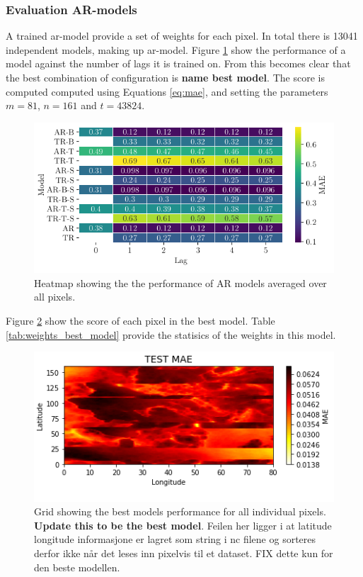 \subsubsection{Evaluation AR-models}
A trained \acrshort{ar}-model provide a set of weights for each pixel. In total there is 13041 independent models, making up \acrshort{ar}-model. Figure \ref{fig:results_ar_models} show the performance of a model against the number of lags it is trained on. From this becomes clear that the best combination of configuration is \textbf{name best model}. The score is computed computed using Equations \eqref{eq:mae}, and setting the parameters $m = 81$, $n=161$ and $t=43824$.
\begin{figure}
    \centering
    \includegraphics{python_figs/heat_ar_model_score.png} %
    \caption{Heatmap showing the the performance of AR models averaged over all pixels.}
    \label{fig:results_ar_models}
\end{figure}
Figure \ref{fig:grid_mse_best_model} show the score of each pixel in the best model. Table \ref{tab:weights_best_model} provide the statisics of the weights in this model.
\begin{figure}
    \centering
    \includegraphics{python_figs/TEST_tcc.png}
    \caption{Grid showing the best models performance for all individual pixels. \textbf{Update this to be the best model}. Feilen her ligger i at latitude longitude informasjone er lagret som string i nc filene og sorteres derfor ikke når det leses inn pixelvis til et dataset. FIX dette kun for den beste modellen.}
    \label{fig:grid_mse_best_model}
\end{figure}

